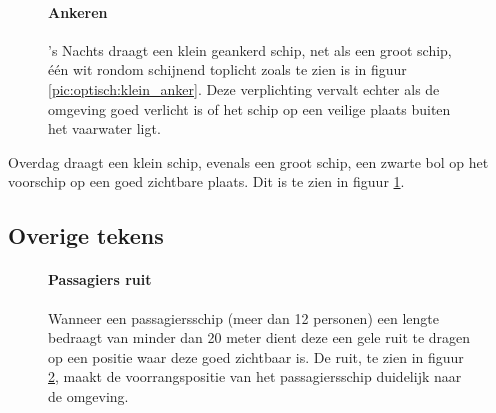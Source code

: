 \begin{figure}[H]
	\centering
	\begin{minipage}[t]{0.50\textwidth}
		\paragraph{Ankeren}
		's Nachts draagt een klein geankerd schip, net als een groot schip, één wit rondom schijnend toplicht zoals te zien is in figuur \ref{pic:optisch:klein_anker}. Deze verplichting vervalt echter als de omgeving goed verlicht is of het schip op een veilige plaats buiten het vaarwater ligt.
	\end{minipage}
	\hfill
	\begin{minipage}[t]{0.22\textwidth}
		\RemoveLine
		\caption{}
		\label{pic:optisch:klein_anker}
	\end{minipage}
	\hfill
	\begin{minipage}[t]{0.22\textwidth}
		\RemoveLine
		\caption{}
		\label{pic:optisch:klein_anker2}
	\end{minipage}
\end{figure}%
\vspace{-0.6cm}%
Overdag draagt een klein schip, evenals een groot schip, een zwarte bol op het voorschip op een goed zichtbare plaats. Dit is te zien in figuur \ref{pic:optisch:klein_anker2}.


\subsection{Overige tekens}
\label{par:optisch:overig}
\begin{figure}[H]
	\centering
	\begin{minipage}[t]{0.75\textwidth}
		\paragraph{Passagiers ruit}
		Wanneer een passagiersschip (meer dan 12 personen) een lengte bedraagt van minder dan 20 meter dient deze een gele ruit te dragen op een positie waar deze goed zichtbaar is. De ruit, te zien in figuur \ref{pic:optisch:gele_ruit}, maakt de voorrangspositie van het passagiersschip duidelijk naar de omgeving. 
	\end{minipage}
	\hfill
	\begin{minipage}[t]{0.22\textwidth}
		\RemoveLine
		\caption{}
		\label{pic:optisch:gele_ruit}
	\end{minipage}
\end{figure}

